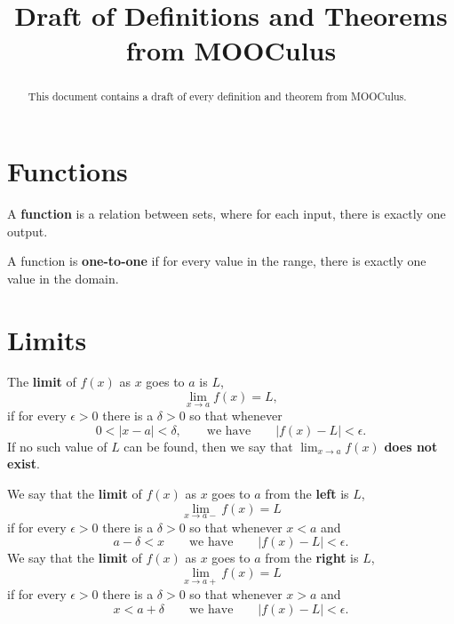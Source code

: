 \documentclass{ximera}
\title{Draft of Definitions and Theorems from MOOCulus}
\begin{document}
\begin{abstract}

This document contains a draft of every definition and theorem from
MOOCulus.

\end{abstract}

\maketitle






\section{Functions}




\begin{definition}
A \textbf{function} is a relation between sets, where for each input,
there is exactly one output.
\end{definition}



\begin{definition}
A function is \textbf{one-to-one} if for every value in the range,
there is exactly one value in the domain.
\end{definition}






\section{Limits}





\begin{definition}
The \textbf{limit} of $f(x)$ as $x$ goes to $a$ is $L$,
\[
\lim_{x\to a}f(x)=L,
\]
if for every $\epsilon>0$ there is a $\delta > 0$ so that whenever
\[
0 < |x-a| < \delta, \qquad\text{we have} \qquad |f(x)-L|<\epsilon.
\]
If no such value of $L$ can be
found, then we say that $\lim_{x\to a}f(x)$ \textbf{does not exist}.
\end{definition}



\begin{definition}
We say that the \textbf{limit} of $f(x)$ as $x$ goes to $a$ from the
\textbf{left} is $L$,
\[
\lim_{x\to a-}f(x)=L
\]
if for every $\epsilon>0$ there is a $\delta > 0$ so that whenever $x< a$ and
\[
a-\delta < x \qquad\text{we have}\qquad |f(x)-L|<\epsilon.
\]
We say that the \textbf{limit} of $f(x)$ as $x$ goes to $a$ from the \textbf{right} is $L$,
\[
\lim_{x\to a+}f(x)=L
\]
if for every $\epsilon>0$ there is a $\delta > 0$ so that whenever $x > a$ and
\[
x<a+\delta \qquad\text{we have}\qquad |f(x)-L|<\epsilon.
\]
\end{definition}
\end{document}
